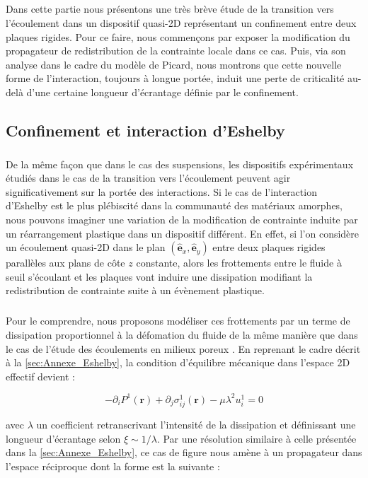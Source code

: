 \stoptocwriting

\label{sec:lambda_picard}

\subparagraph{}Dans cette partie nous présentons une très brève étude de la transition vers l'écoulement dans un dispositif quasi-2D représentant un confinement entre deux plaques rigides. Pour ce faire, nous commençons par exposer la modification du propagateur de redistribution de la contrainte locale dans ce cas. Puis, via son analyse dans le cadre du modèle de Picard, nous montrons que cette nouvelle forme de l'interaction, toujours à longue portée, induit une perte de criticalité au-delà d'une certaine longueur d'écrantage définie par le confinement.

\subsection{Confinement et interaction d'Eshelby}

\subparagraph{}De la même façon que dans le cas des suspensions, les dispositifs expérimentaux étudiés dans le cas de la transition vers l'écoulement peuvent agir significativement sur la portée des interactions. Si le cas de l'interaction d'Eshelby est le plus plébiscité dans la communauté des matériaux amorphes, nous pouvons imaginer une variation de la modification de contrainte induite par un réarrangement plastique dans un dispositif différent. En effet, si l'on considère un écoulement quasi-2D dans le plan $(\hat{\mathbf{e}}_x, \hat{\mathbf{e}}_y)$ entre deux plaques rigides parallèles aux plans de côte $z$ constante, alors les frottements entre le fluide à seuil s'écoulant et les plaques vont induire une dissipation modifiant la redistribution de contrainte suite à un évènement plastique. 

\subparagraph{}Pour le comprendre, nous proposons modéliser ces frottements par un terme de dissipation proportionnel à la défomation du fluide de la même manière que dans le cas de l'étude des écoulements en milieux poreux \cite{long_note_2001}. En reprenant le cadre décrit à la \autoref{sec:Annexe_Eshelby}, la condition d'équilibre mécanique dans l'espace 2D effectif devient :

\begin{equation}
	-\partial_i P^1(\mathbf{r}) + \partial_j\sigma_{ij}^1(\mathbf{r}) - \mu\lambda^2 u^1_{i}= 0
\end{equation}

\noindent avec $\lambda$ un coefficient retranscrivant l'intensité de la dissipation et définissant une longueur d'écrantage selon $\xi \sim 1/\lambda$. Par une résolution similaire à celle présentée dans la \autoref{sec:Annexe_Eshelby}, ce cas de figure nous amène à un propagateur dans l'espace réciproque dont la forme est la suivante :

